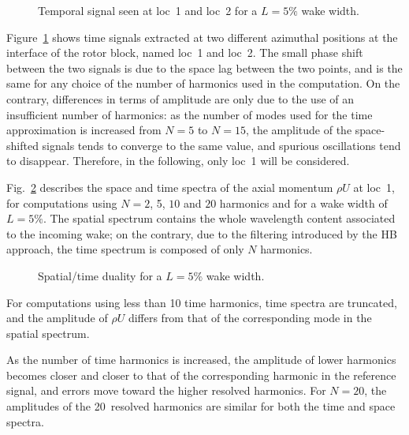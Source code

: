 \begin{figure}[htp]
\centering
  \caption{Temporal signal seen at loc~1 and loc~2 for a $L=5\%$ wake width.}
  \label{fig:temp_signal}
\end{figure}
Figure~\ref{fig:temp_signal} shows time signals
extracted at two different azimuthal positions at 
the interface of the rotor block, named loc~1 and loc~2. 
The small phase shift between the two 
signals is due to the space lag between the two points, 
and is the same for any choice of the number of 
harmonics used in the computation. On the contrary, 
differences in terms of amplitude are only due 
to the use of an insufficient number of harmonics: 
as the number of modes used for the time 
approximation is increased from $N=5$ to $N=15$, 
the amplitude of the space-shifted signals 
tends to converge to the same value, and 
spurious oscillations tend to disappear. Therefore, in the following,
only loc~1 will be considered.

Fig.~\ref{fig:dualite_crit} describes the space and 
time spectra of the axial momentum $\rho U$ at loc~1, 
for computations using $N=2$, 5, $10$ and $20$ 
harmonics and for a wake width of $L=5\%$.
The spatial spectrum contains the whole wavelength 
content associated to the incoming wake; 
on the contrary, due to the filtering introduced 
by the HB approach, the time spectrum is composed of only $N$ harmonics.
\begin{figure}[htp]
\centering
{}
\caption{Spatial/time duality for a $L=5\%$ wake width.}
\label{fig:dualite_crit}
\end{figure}

For computations using less than 10 time harmonics, 
time spectra are truncated, and the amplitude of 
$\rho U$ differs from that of the corresponding mode in the spatial spectrum.

As the number of time harmonics is increased, 
the amplitude of lower harmonics becomes closer 
and closer to that of the corresponding harmonic 
in the reference signal, and errors move toward 
the higher resolved harmonics. For $N=20$, 
the amplitudes of the 20~resolved harmonics are 
similar for both the time and space spectra.

